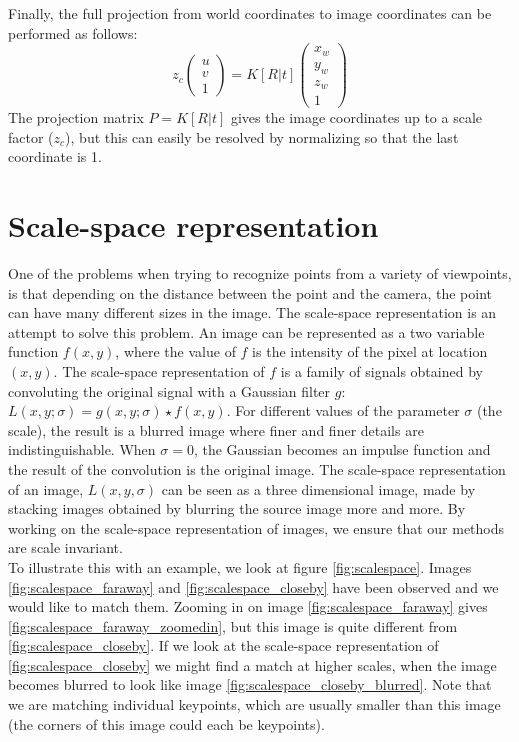 Finally, the full projection from world coordinates to image coordinates can be performed as follows:
\begin{equation}
  z_c\begin{pmatrix} u\\v\\1\end{pmatrix} =
    K[R|t]\begin{pmatrix} x_w\\y_w\\z_w\\1\end{pmatrix}
\end{equation}
The projection matrix $P = K[R|t]$ gives the image coordinates up to a scale factor ($z_c$), but this can easily be resolved by normalizing so that the last coordinate is 1.


\section{Scale-space representation}
One of the problems when trying to recognize points from a variety of viewpoints, is that depending on the distance between the point and the camera, the point can have many different sizes in the image. The scale-space representation is an attempt to solve this problem. An image can be represented as a two variable function $f(x,y)$, where the value of $f$ is the intensity of the pixel at location $(x,y)$. The scale-space representation of $f$ is a family of signals obtained by convoluting the original signal with a Gaussian filter $g$: $L(x,y;\sigma) = g(x,y;\sigma) \star f(x,y)$. For different values of the parameter $\sigma$ (the scale), the result is a blurred image where finer and finer details are indistinguishable. When $\sigma=0$, the Gaussian becomes an impulse function and the result of the convolution is the original image. The scale-space representation of an image, $L(x,y,\sigma)$ can be seen as a three dimensional image, made by stacking images obtained by blurring the source image more and more. By working on the scale-space representation of images, we ensure that our methods are scale invariant. \cite{scalespace}\\
To illustrate this with an example, we look at figure \ref{fig:scalespace}. Images \ref{fig:scalespace_faraway} and \ref{fig:scalespace_closeby} have been observed and we would like to match them. Zooming in on image \ref{fig:scalespace_faraway} gives \ref{fig:scalespace_faraway_zoomedin}, but this image is quite different from \ref{fig:scalespace_closeby}. If we look at the scale-space representation of \ref{fig:scalespace_closeby} we might find a match at higher scales, when the image becomes blurred to look like image \ref{fig:scalespace_closeby_blurred}. Note that we are matching individual keypoints, which are usually smaller than this image (the corners of this image could each be keypoints).

